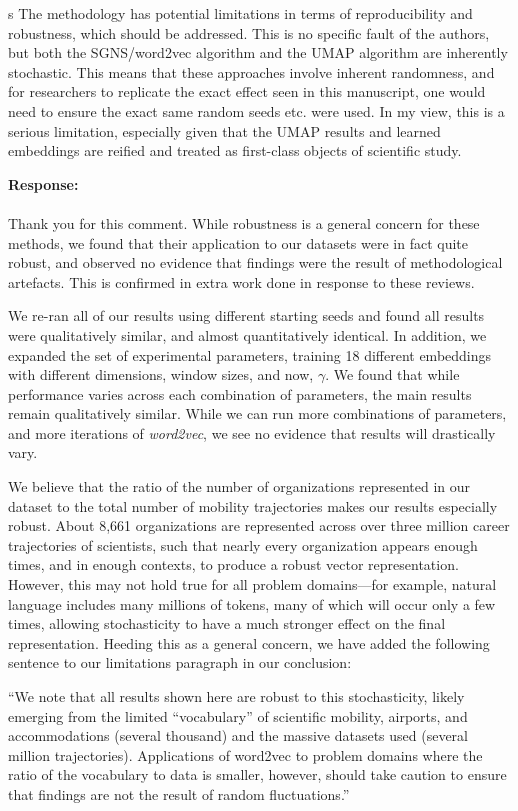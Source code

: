 \documentclass[12pt,a4paper]{article}
\newcounter{comment}[subsection]
\newcommand{\response}[1]{{\noindent \textbf{Response:} \\ \\ \noindent #1}}
\newcommand{\rcomment}[1]{%
\vspace{10pt}
\begin{sectionbox}
s #1
\end{sectionbox}
}
\begin{document}
\rcomment{%
	The methodology has potential limitations in terms of reproducibility and robustness, which should be addressed. This is no specific fault of the authors, but both the SGNS/word2vec algorithm and the UMAP algorithm are inherently stochastic. This means that these approaches involve inherent randomness, and for researchers to replicate the exact effect seen in this manuscript, one would need to ensure the exact same random seeds etc. were used. In my view, this is a serious limitation, especially given that the UMAP results and learned embeddings are reified and treated as first-class objects of scientific study.
}

\response{Thank you for this comment. While robustness is a general concern for these methods, we found that their application to our datasets were in fact quite robust, and observed no evidence that findings were the result of methodological artefacts. This is confirmed in extra work done in response to these reviews.

	We re-ran all of our results using different starting seeds and found all results were qualitatively similar, and almost quantitatively identical.
	In addition, we expanded the set of experimental parameters, training 18 different embeddings with different dimensions, window sizes, and now, $\gamma$.
	We found that while performance varies across each combination of parameters, the main results remain qualitatively similar.
	While we can run more combinations of parameters, and more iterations of \textit{word2vec}, we see no evidence that results will drastically vary.

	We believe that the ratio of the number of organizations represented in our dataset to the total number of mobility trajectories makes our results especially robust.
	About 8,661 organizations are represented across over three million career trajectories of scientists, such that nearly every organization appears enough times, and in enough contexts, to produce a robust vector representation.
	However, this may not hold true for all problem domains—for example, natural language includes many millions of tokens, many of which will occur only a few times, allowing stochasticity to have a much stronger effect on the final representation.
	Heeding this as a general concern, we have added the following sentence to our limitations paragraph in our conclusion:

	“We note that all results shown here are robust to this stochasticity, likely emerging from the limited ``vocabulary'' of scientific mobility, airports, and accommodations (several thousand) and the massive datasets used (several million trajectories). Applications of word2vec to problem domains where the ratio of the vocabulary to data is smaller, however, should take caution to ensure that findings are not the result of random fluctuations.”

}
\end{document}
